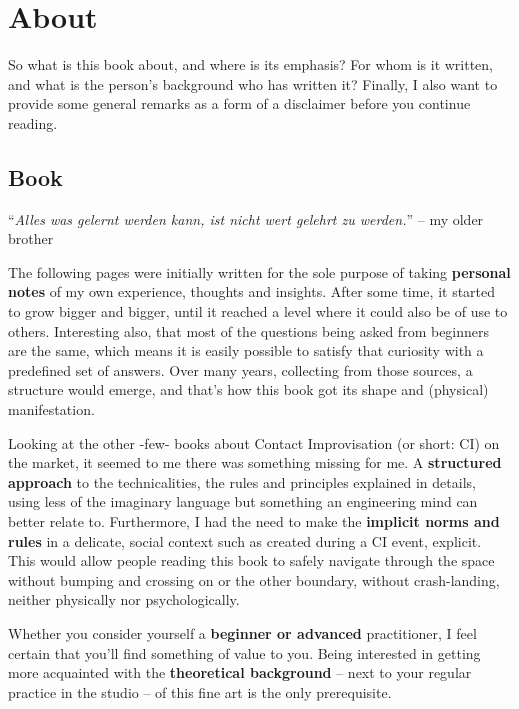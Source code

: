 \chapter{About}\label{ch:about}


So what is this book about, and where is its emphasis?
For whom is it written, and what is the person's background who has written it?
Finally, I also want to provide some general remarks as a form of a disclaimer before you continue reading.

\section{Book}\label{sec:book}

\begin{displayquote}
    ``\textit{Alles was gelernt werden kann, ist nicht wert gelehrt zu werden.}'' -- my older brother
\end{displayquote}

The following pages were initially written for the sole purpose of taking \textbf{personal notes} of my own experience, thoughts and insights.
After some time, it started to grow bigger and bigger, until it reached a level where it could also be of use to others.
Interesting also, that most of the questions being asked from beginners are the same, which means it is easily possible to satisfy that curiosity with a predefined set of answers.
Over many years, collecting from those sources, a structure would emerge, and that's how this book got its shape and (physical) manifestation.

Looking at the other -few- books about Contact Improvisation (or short: CI) on the market, it seemed to me there was something missing for me.
A \textbf{structured approach} to the technicalities, the rules and principles explained in details, using less of the imaginary language but something an engineering mind can better relate to.
Furthermore, I had the need to make the \textbf{implicit norms and rules} in a delicate, social context such as created during a CI event, explicit.
This would allow people reading this book to safely navigate through the space without bumping and crossing on or the other boundary, without crash-landing, neither physically nor psychologically.

Whether you consider yourself a \textbf{beginner or advanced} practitioner, I feel certain that you'll find something of value to you.
Being interested in getting more acquainted with the \textbf{theoretical background} -- next to your regular practice in the studio -- of this fine art is the only prerequisite.

